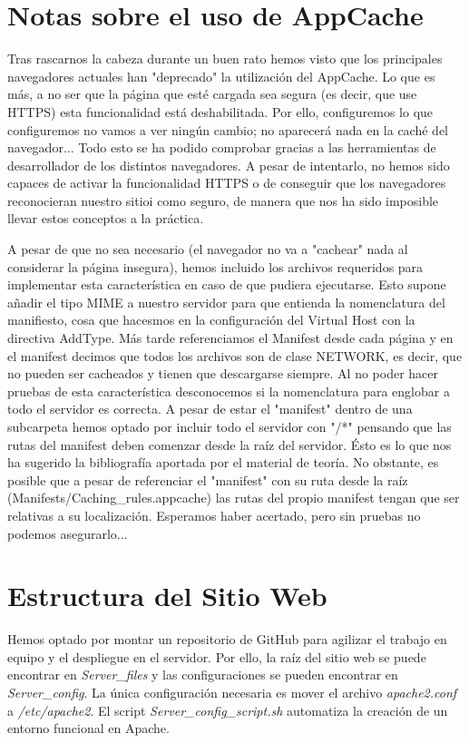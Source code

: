 \documentclass{article}[13pt]
\begin{document}
  \section{Notas sobre el uso de AppCache}
    Tras rascarnos la cabeza durante un buen rato hemos visto que los principales navegadores actuales han "deprecado" la utilización del AppCache. Lo que es más, a no ser que la página que esté cargada sea segura (es decir, que use HTTPS) esta funcionalidad está deshabilitada. Por ello, configuremos lo que configuremos no vamos a ver ningún cambio; no aparecerá nada en la caché del navegador... Todo esto se ha podido comprobar gracias a las herramientas de desarrollador de los distintos navegadores. A pesar de intentarlo, no hemos sido capaces de activar la funcionalidad HTTPS o de conseguir que los navegadores reconocieran nuestro sitioi como seguro, de manera que nos ha sido imposible llevar estos conceptos a la práctica.

    A pesar de que no sea necesario (el navegador no va a "cachear" nada al considerar la página insegura), hemos incluido los archivos requeridos para implementar esta característica en caso de que pudiera ejecutarse. Esto supone añadir el tipo MIME a nuestro servidor para que entienda la nomenclatura del manifiesto, cosa que hacesmos en la configuración del Virtual Host con la directiva AddType. Más tarde referenciamos el Manifest desde cada página y en el manifest decimos que todos los archivos son de clase NETWORK, es decir, que no pueden ser cacheados y tienen que descargarse siempre. Al no poder hacer pruebas de esta característica desconocemos si la nomenclatura para englobar a todo el servidor es correcta. A pesar de estar el "manifest" dentro de una subcarpeta hemos optado por incluir todo el servidor con "/*" pensando que las rutas del manifest deben comenzar desde la raíz del servidor. Ésto es lo que nos ha sugerido la bibliografía aportada por el material de teoría. No obstante, es posible que a pesar de referenciar el "manifest" con su ruta desde la raíz (Manifests/Caching\_rules.appcache) las rutas del propio manifest tengan que ser relativas a su localización. Esperamos haber acertado, pero sin pruebas no podemos asegurarlo...

  \section{Estructura del Sitio Web}
    Hemos optado por montar un repositorio de GitHub para agilizar el trabajo en equipo y el despliegue en el servidor. Por ello, la raíz del sitio web se puede encontrar en \textit{Server\_files} y las configuraciones se pueden encontrar en \textit{Server\_config}. La única configuración necesaria es mover el archivo \textit{apache2.conf} a \textit{/etc/apache2}. El script \textit{Server\_config\_script.sh} automatiza la creación de un entorno funcional en Apache.
\end{document}
